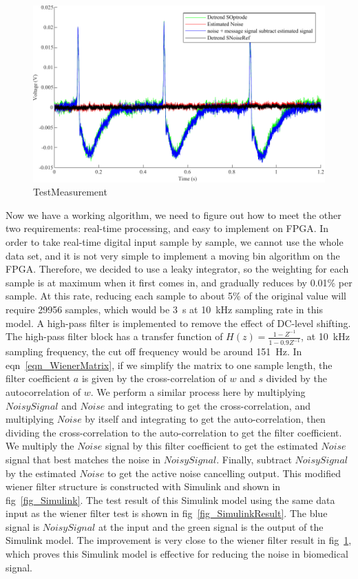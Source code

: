 \begin{figure}[!ht]
\centering
\includegraphics[width=1\linewidth]{4-ANC_Sys/TestMeasurement.pdf}
\caption{TestMeasurement}
\label{fig_TestMeasurement}
\end{figure}

Now we have a working algorithm, we need to figure out how to meet the other two requirements: real-time processing, and easy to implement on FPGA.  In order to take real-time digital input sample by sample, we cannot use the whole data set, and it is not very simple to implement a moving bin algorithm on the FPGA.  Therefore, we decided to use a leaky integrator, so the weighting for each sample is at maximum when it first comes in, and gradually reduces by 0.01\% per sample.  At this rate, reducing each sample to about 5\% of the original value will require 29956 samples, which would be \qty{3}{s} at \qty{10}{kHz} sampling rate in this model.  A high-pass filter is implemented to remove the effect of DC-level shifting.  The high-pass filter block has a transfer function of $H(z)=\frac{1-Z^{-1}}{1-0.9Z^{-1}}$, at \qty{10}{kHz} sampling frequency, the cut off frequency would be around \qty{151}{Hz}.  In eqn~\ref{eqn_WienerMatrix}, if we simplify the matrix to one sample length, the filter coefficient $a$ is given by the cross-correlation of $w$ and $s$ divided by the autocorrelation of $w$.  We perform a similar process here by multiplying $NoisySignal$ and $Noise$ and integrating to get the cross-correlation, and multiplying $Noise$ by itself and integrating to get the auto-correlation, then dividing the cross-correlation to the auto-correlation to get the filter coefficient.  We multiply the $Noise$ signal by this filter coefficient to get the estimated $Noise$ signal that best matches the noise in $NoisySignal$.  Finally, subtract $NoisySignal$ by the estimated $Noise$ to get the active noise cancelling output.  This modified wiener filter structure is constructed with Simulink and shown in fig~\ref{fig_Simulink}.  The test result of this Simulink model using the same data input as the wiener filter test is shown in fig~\ref{fig_SimulinkResult}.  The blue signal is $NoisySignal$ at the input and the green signal is the output of the Simulink model.  The improvement is very close to the wiener filter result in fig~\ref{fig_TestMeasurement}, which proves this Simulink model is effective for reducing the noise in biomedical signal.

